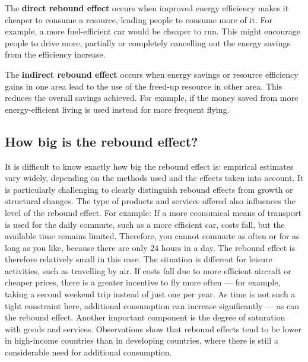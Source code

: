 \documentclass[
  a4paper,
  openany]{book}
\begin{document}
\begin{tcolorbox}[enhanced jigsaw, coltitle=black, bottomtitle=1mm, opacitybacktitle=0.6, titlerule=0mm, opacityback=0, leftrule=.75mm, colbacktitle=quarto-callout-note-color!10!white, bottomrule=.15mm, toptitle=1mm, breakable, title={Rebound-effects}, arc=.35mm, rightrule=.15mm, toprule=.15mm, left=2mm, colback=white, colframe=quarto-callout-note-color-frame]

The \textbf{direct rebound effect} occurs when improved energy
efficiency makes it cheaper to consume a resource, leading people to
consume more of it. For example, a more fuel-efficient car would be
cheaper to run. This might encourage people to drive more, partially or
completely cancelling out the energy savings from the efficiency
increase.

The \textbf{indirect rebound effect} occurs when energy savings or
resource efficiency gains in one area lead to the use of the freed-up
resource in other area. This reduces the overall savings achieved. For
example, if the money saved from more energy-efficient living is used
instead for more frequent flying.

\end{tcolorbox}

\subsection{How big is the rebound
effect?}\label{how-big-is-the-rebound-effect}

It is difficult to know exactly how big the rebound effect is: empirical
estimates vary widely, depending on the methods used and the effects
taken into account. It is particularly challenging to clearly
distinguish rebound effects from growth or structural changes. The type
of products and services offered also influences the level of the
rebound effect. For example: If a more economical means of transport is
used for the daily commute, such as a more efficient car, costs fall,
but the available time remains limited. Therefore, you cannot commute as
often or for as long as you like, because there are only 24 hours in a
day. The rebound effect is therefore relatively small in this case. The
situation is different for leisure activities, such as travelling by
air. If costs fall due to more efficient aircraft or cheaper prices,
there is a greater incentive to fly more often --- for example, taking a
second weekend trip instead of just one per year. As time is not such a
tight constraint here, additional consumption can increase significantly
--- as can the rebound effect. Another important component is the degree
of saturation with goods and services. Observations show that rebound
effects tend to be lower in high-income countries than in developing
countries, where there is still a considerable need for additional
consumption.
\end{document}

